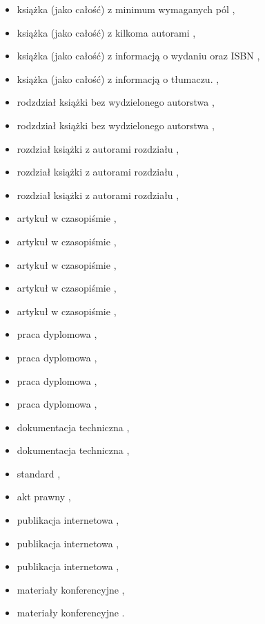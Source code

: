 \begin{itemize} \footnotesize
    \item książka (jako całość) z minimum wymaganych pól \cite{Gorski2023},
    \item książka (jako całość) z kilkoma autorami \cite{Kurczab2016},
    \item książka (jako całość) z informacją o wydaniu oraz ISBN \cite{Rowling2000},
    \item książka (jako całość) z informacją o tłumaczu. \cite{AlKhalili2022},
    \item rodzdział książki bez wydzielonego autorstwa \cite{Smith2018},
    \item rodzdział książki bez wydzielonego autorstwa \cite{Peterson2019},
    \item rozdział książki z autorami rozdziału \cite{Kraus2010},
    \item rozdział książki z autorami rozdziału \cite{Isidori2023},
    \item rozdział książki z autorami rozdziału \cite{Gregerson2010},
    \item artykuł w czasopiśmie \cite{Nowak2023},
    \item artykuł w czasopiśmie \cite{Xu2023},
    \item artykuł w czasopiśmie \cite{Mashatan2007},
    \item artykuł w czasopiśmie \cite{Hwang2006},
    \item artykuł w czasopiśmie \cite{Joye2007},
    \item praca dyplomowa \cite{Cwik2018},
    \item praca dyplomowa \cite{Marszalek2023},
    \item praca dyplomowa \cite{Urbanski2023},
    \item praca dyplomowa \cite{Otto2004},
    \item dokumentacja techniczna \cite{LPC2212},
    \item dokumentacja techniczna \cite{NIST-SP-800-22},
    \item standard \cite{FIPS140-2},
    \item akt prawny \cite{ust2001-09-18},
    \item publikacja internetowa \cite{Schneier2017},
    \item publikacja internetowa \cite{Craddock2017},
    \item publikacja internetowa \cite{MatlabPerformance2015},
    \item materiały konferencyjne \cite{Duckworth2019},
    \item materiały konferencyjne \cite{Jun2006}.
\end{itemize}

